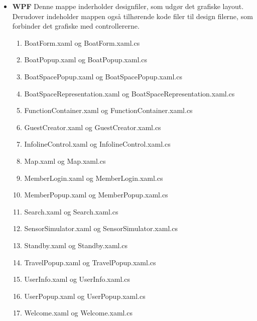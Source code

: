 \begin{itemize}
	\item \textbf{WPF} Denne mappe inderholder designfiler, som udgør det grafiske layout. Derudover indeholder mappen også tilhørende kode filer til design filerne, som forbinder det grafiske med controllererne.
		\begin{enumerate}
			\item BoatForm.xaml og BoatForm.xaml.cs
			\item BoatPopup.xaml og BoatPopup.xaml.cs
			\item BoatSpacePopup.xaml og BoatSpacePopup.xaml.cs
			\item BoatSpaceRepresentation.xaml og BoatSpaceRepresentation.xaml.cs
			\item FunctionContainer.xaml og FunctionContainer.xaml.cs
			\item GuestCreator.xaml og GuestCreator.xaml.cs
			\item InfolineControl.xaml og InfolineControl.xaml.cs
			\item Map.xaml og Map.xaml.cs
			\item MemberLogin.xaml og MemberLogin.xaml.cs
			\item MemberPopup.xaml og MemberPopup.xaml.cs
			\item Search.xaml og Search.xaml.cs
			\item SensorSimulator.xaml og SensorSimulator.xaml.cs
			\item Standby.xaml og Standby.xaml.cs
			\item TravelPopup.xaml og TravelPopup.xaml.cs
			\item UserInfo.xaml og UserInfo.xaml.cs
			\item UserPopup.xaml og UserPopup.xaml.cs
			\item Welcome.xaml og Welcome.xaml.cs
		\end{enumerate}
\end{itemize}
